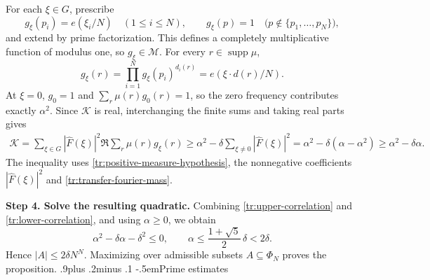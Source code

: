 \documentclass[twoside]{aomart}
\makeatletter
\theoremstyle{paperplain}
\theoremstyle{paperdefinition}
\renewcommand\subsection{\@startsection{subsection}{2}{\z@}
  {.9\baselineskip plus .2\baselineskip minus .1\baselineskip}
  {-.5em}{\normalfont\bfseries}}
\renewenvironment{proof}[1][\proofname]{\par\pushQED{\qed}%
  \normalfont\topsep6\p@\@plus3\p@\relax\trivlist
  \item[\hskip\labelsep\itshape #1\@addpunct{.}]\ignorespaces
}{\popQED\endtrivlist\@endpefalse}
\numberwithin{equation}{section}
\makeatother
\begin{document}
\begin{proof}
For each $\xi\in G$, prescribe
\begin{equation*}
 g_\xi(p_i)=e(\xi_i/N)\quad(1\le i\le N),\qquad
 g_\xi(p)=1\quad\bigl(p\notin\{p_1,\ldots,p_N\}\bigr),
\end{equation*}
and extend by prime factorization. This defines a completely
multiplicative function of modulus one, so $g_\xi\in\mathcal M$.
For every $r\in\operatorname{supp}\mu$,
\begin{equation*}
 g_\xi(r)=\prod_{i=1}^N g_\xi(p_i)^{d_i(r)}
         =e(\xi\cdot d(r)/N).
\end{equation*}
At $\xi=0$, $g_0=1$ and $\sum_r\mu(r)g_0(r)=1$, so the zero
frequency contributes exactly $\alpha^2$. Since $\mathcal K$ is real,
interchanging the finite sums and taking real parts gives
\begin{equation}
 \begin{aligned}
 \mathcal K
 =\sum_{\xi\in G}|\widehat F(\xi)|^2
       \Re\sum_r\mu(r)g_\xi(r)
 \ge\alpha^2-\delta\sum_{\xi\ne0}|\widehat F(\xi)|^2
 =\alpha^2-\delta(\alpha-\alpha^2)
 \ge\alpha^2-\delta\alpha.
 \end{aligned}
 \label{tr:lower-correlation}
\end{equation}
The inequality uses \eqref{tr:positive-measure-hypothesis}, the nonnegative coefficients
$|\widehat F(\xi)|^2$ and \eqref{tr:transfer-fourier-mass}.

\par
\medskip
\noindent\textbf{Step 4. Solve the resulting quadratic.}
Combining \eqref{tr:upper-correlation} and
\eqref{tr:lower-correlation}, and using $\alpha\ge0$, we obtain
\begin{equation*}
 \alpha^2-\delta\alpha-\delta^2\le0,
 \qquad
 \alpha\le\frac{1+\sqrt5}{2}\,\delta<2\delta.
\end{equation*}
Hence $|A|\le2\delta N^N$. Maximizing over admissible subsets
$A\subseteq\Phi_N$ proves the proposition.
\end{proof}
\subsection{Prime estimates}
\end{document}
